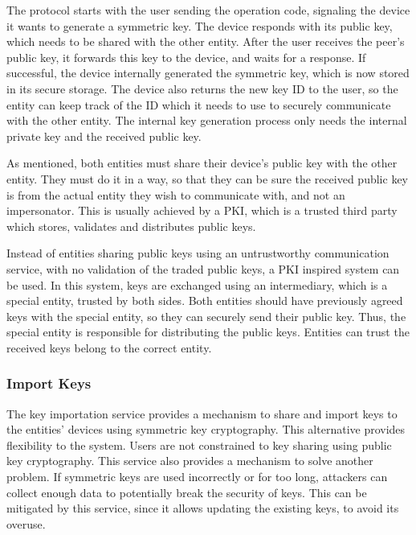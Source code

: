 The protocol starts with the user sending the operation code, signaling the device it wants to generate a symmetric key. The device responds with its public key, which needs to be shared with the other entity. After the user receives the peer's public key, it forwards this key to the device, and waits for a response. If successful, the device internally generated the symmetric key, which is now stored in its secure storage. The device also returns the new key ID to the user, so the entity can keep track of the ID which it needs to use to securely communicate with the other entity.
The internal key generation process only needs the internal private key and the received public key.

As mentioned, both entities must share their device's public key with the other entity. They must do it in a way, so that they can be sure the received public key is from the actual entity they wish to communicate with, and not an impersonator. This is usually achieved by a PKI, which is a trusted third party which stores, validates and distributes public keys. 

Instead of entities sharing public keys using an untrustworthy communication service, with no validation of the traded public keys, a PKI inspired system can be used. 
In this system, keys are exchanged using an intermediary, which is a special entity, trusted by both sides. Both entities should have previously agreed keys with the special entity, so they can securely send their public key. Thus, the special entity is responsible for distributing the public keys. Entities can trust the received keys belong to the correct entity.

\subsubsection{Import Keys}\label{chap:arch:services:new-comms:import}

The key importation service provides a mechanism to share and import keys to the entities' devices using symmetric key cryptography. This alternative provides flexibility to the system.
Users are not constrained to key sharing using public key cryptography. This service also provides a mechanism to solve another problem. If symmetric keys are used incorrectly or for too long, attackers can collect enough data to potentially break the security of keys. This can be mitigated by this service, since it allows updating the existing keys, to avoid its overuse.

